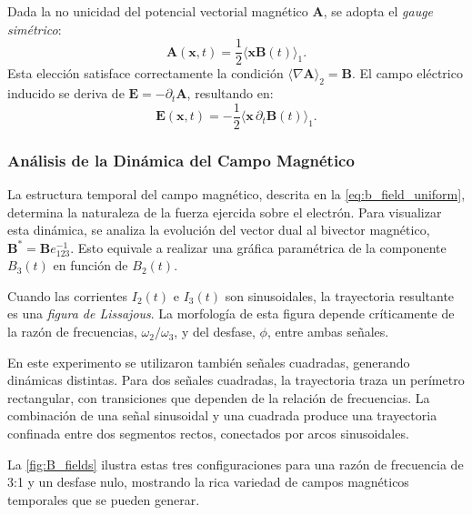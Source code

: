 Dada la no unicidad del potencial vectorial magnético $\boldsymbol{A}$, se
adopta el \emph{gauge simétrico}:
%
\begin{equation}
	\boldsymbol{A}(\boldsymbol{x}, t) = \frac{1}{2}
	\langle \boldsymbol{x} \boldsymbol{B}(t) \rangle_{1}.
	\label{eq:symmetric_gauge}
\end{equation}
%
Esta elección satisface correctamente la condición
$\langle \nabla \boldsymbol{A} \rangle_{2} = \boldsymbol{B}$.
El campo eléctrico inducido se deriva de
$\boldsymbol{E} = - \partial_t \boldsymbol{A}$, resultando en:
%
\begin{equation}
	\boldsymbol{E}(\boldsymbol{x}, t) = - \frac{1}{2} \langle \boldsymbol{x}
	\, \partial_t \boldsymbol{B}(t) \rangle_{1}.
	\label{eq:E_induced_uniform}
\end{equation}

\subsubsection{Análisis de la Dinámica del Campo Magnético}
\label{sssec:dinamica_b}

La estructura temporal del campo magnético, descrita en la
\cref{eq:b_field_uniform}, determina la naturaleza de la fuerza ejercida
sobre el electrón. Para visualizar esta dinámica, se analiza la
evolución del vector dual al bivector magnético,
$\boldsymbol{B}^* = \boldsymbol{B}e_{123}^{-1}$. Esto equivale a realizar
una gráfica paramétrica de la componente $B_3(t)$ en función de $B_2(t)$.

Cuando las corrientes $I_2(t)$ e $I_3(t)$ son sinusoidales, la
trayectoria resultante es una \emph{figura de Lissajous}. La morfología de
esta figura depende críticamente de la razón de frecuencias,
$\omega_2/\omega_3$, y del desfase, $\phi$, entre ambas señales.

En este experimento se utilizaron también señales cuadradas, generando
dinámicas distintas. Para dos señales cuadradas, la trayectoria traza un
perímetro rectangular, con transiciones que dependen de la relación de
frecuencias. La combinación de una señal sinusoidal y una cuadrada
produce una trayectoria confinada entre dos segmentos rectos, conectados
por arcos sinusoidales.

La \cref{fig:B_fields} ilustra estas tres configuraciones para una razón
de frecuencia de 3:1 y un desfase nulo, mostrando la rica variedad de
campos magnéticos temporales que se pueden generar.

